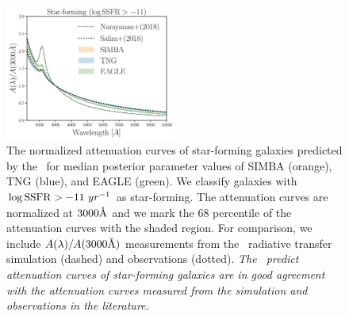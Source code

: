\begin{figure}
\begin{center}
    \includegraphics[width=0.5\textwidth]{figs/abc_sf_attenuation.pdf}
    \caption{\label{fig:sfatten}
    The normalized attenuation curves of star-forming galaxies predicted by
    the \eda~for median posterior parameter values of SIMBA (orange), TNG
    (blue), and EAGLE (green).  
    We classify galaxies with $\log {\rm SSFR} > -11~yr^{-1}$ as star-forming. 
    The attenuation curves are normalized at $3000\AA$ and we mark the
    68 percentile of the attenuation curves with the shaded region.
    For comparison, we include $A(\lambda)/A(3000\AA)$ measurements from
    the~\cite{narayanan2018} radiative transfer simulation (dashed) and
    \cite{salim2018} observations (dotted).
    {\em The \eda~predict attenuation curves of star-forming galaxies
    are in good agreement with the attenuation curves measured from
    the simulation and observations in the literature.}
    }
\end{center}
\end{figure}

